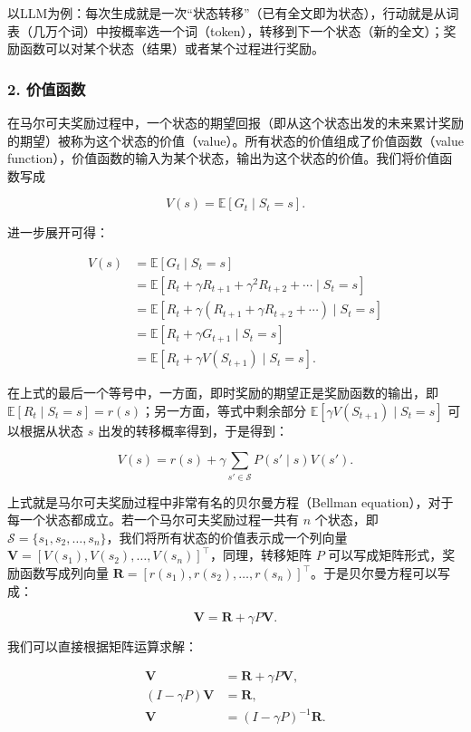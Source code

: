 以LLM为例：每次生成就是一次``状态转移''（已有全文即为状态），行动就是从词表（几万个词）中按概率选一个词（token），转移到下一个状态（新的全文）；奖励函数可以对某个状态（结果）或者某个过程进行奖励。

\hypertarget{ux4ef7ux503cux51fdux6570}{%
\subsubsection{2. 价值函数}\label{ux4ef7ux503cux51fdux6570}}

在马尔可夫奖励过程中，一个状态的期望回报（即从这个状态出发的未来累计奖励的期望）被称为这个状态的价值（value）。所有状态的价值组成了价值函数（value function），价值函数的输入为某个状态，输出为这个状态的价值。我们将价值函数写成

\[
V(s)=\mathbb{E}[G_t\mid S_t=s].
\]

进一步展开可得：

\[
\begin{aligned}
V(s)
&=\mathbb{E}[G_t\mid S_t=s]\\
&=\mathbb{E}[R_t+\gamma R_{t+1}+\gamma^{2} R_{t+2}+\cdots\mid S_t=s]\\
&=\mathbb{E}[R_t+\gamma(R_{t+1}+\gamma R_{t+2}+\cdots)\mid S_t=s]\\
&=\mathbb{E}[R_t+\gamma G_{t+1}\mid S_t=s]\\
&=\mathbb{E}[R_t+\gamma V(S_{t+1})\mid S_t=s].
\end{aligned}
\]

在上式的最后一个等号中，一方面，即时奖励的期望正是奖励函数的输出，即 \(\mathbb{E}[R_t\mid S_t=s]=r(s)\)；另一方面，等式中剩余部分 \(\mathbb{E}[\gamma V(S_{t+1})\mid S_t=s]\) 可以根据从状态 \(s\) 出发的转移概率得到，于是得到：

\[
V(s)=r(s)+\gamma\sum_{s'\in\mathcal{S}}P(s'\mid s)V(s').
\]

上式就是马尔可夫奖励过程中非常有名的贝尔曼方程（Bellman equation），对于每一个状态都成立。若一个马尔可夫奖励过程一共有 \(n\) 个状态，即 \(\mathcal{S}=\{s_1,s_2,\ldots,s_n\}\)，我们将所有状态的价值表示成一个列向量 \(\mathbf{V}=[V(s_1),V(s_2),\ldots,V(s_n)]^{\top}\)，同理，转移矩阵 \(P\) 可以写成矩阵形式，奖励函数写成列向量 \(\mathbf{R}=[r(s_1),r(s_2),\ldots,r(s_n)]^{\top}\)。于是贝尔曼方程可以写成：

\[
\mathbf{V}=\mathbf{R}+\gamma P\mathbf{V}.
\]

我们可以直接根据矩阵运算求解：

\[
\begin{aligned}
\mathbf{V}&=\mathbf{R}+\gamma P\mathbf{V},\\
(I-\gamma P)\mathbf{V}&=\mathbf{R},\\
\mathbf{V}&=(I-\gamma P)^{-1}\mathbf{R}.
\end{aligned}
\]

